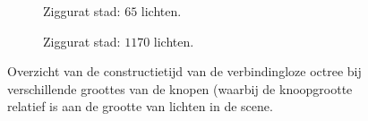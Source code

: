 \begin{figure}[p]
\begin{adjustbox}{minipage=\textwidth, scale=0.5}
\begin{subfigure}[b]{0.83\textwidth}
      \caption{Ziggurat stad: $65$ lichten.}
      \label{fig:hs-nodesize-construction-time::zc-low}
    \end{subfigure}
  \end{adjustbox} %
  \begin{adjustbox}{minipage=\textwidth, scale=0.5}
    \begin{subfigure}[b]{0.83\textwidth}
      \centering
      \def\svgwidth{\textwidth}
      
      \caption{Ziggurat stad: $1170$ lichten.}
      \label{fig:hs-nodesize-construction-time::zc-high}
    \end{subfigure}
  \end{adjustbox}
  \caption{Overzicht van de constructietijd van de verbindingloze octree
           bij verschillende groottes van de knopen (waarbij de knoopgrootte
           relatief is aan de grootte van lichten in de scene.}
  \label{fig:hs-nodesize-construction-time}
\end{figure}

